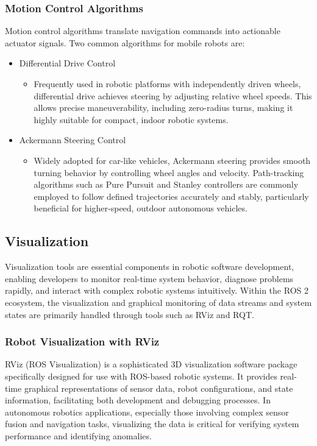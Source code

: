 \documentclass[english,project]{buwthesis}
\begin{document}
\subsubsection{Motion Control Algorithms}
Motion control algorithms translate navigation commands into actionable actuator signals. Two common algorithms for mobile robots are:
\begin{itemize}
    \item Differential Drive Control
    \begin{itemize}
        \item Frequently used in robotic platforms with independently driven wheels, differential drive achieves steering by adjusting relative wheel speeds. This allows precise maneuverability, including zero-radius turns, making it highly suitable for compact, indoor robotic systems.
    \end{itemize}


    \item Ackermann Steering Control
    \begin{itemize}
        \item Widely adopted for car-like vehicles, Ackermann steering provides smooth turning behavior by controlling wheel angles and velocity. Path-tracking algorithms such as Pure Pursuit and Stanley controllers are commonly employed to follow defined trajectories accurately and stably, particularly beneficial for higher-speed, outdoor autonomous vehicles.
    \end{itemize}
\end{itemize}

\subsection{Visualization}
Visualization tools are essential components in robotic software development, enabling developers to monitor real-time system behavior, diagnose problems rapidly, and interact with complex robotic systems intuitively. Within the ROS 2 ecosystem, the visualization and graphical monitoring of data streams and system states are primarily handled through tools such as RViz and RQT.
\subsubsection{Robot Visualization with RViz}
RViz (ROS Visualization) is a sophisticated 3D visualization software package specifically designed for use with ROS-based robotic systems. It provides real-time graphical representations of sensor data, robot configurations, and state information, facilitating both development and debugging processes. In autonomous robotics applications, especially those involving complex sensor fusion and navigation tasks, visualizing the data is critical for verifying system performance and identifying anomalies.
\end{document}

